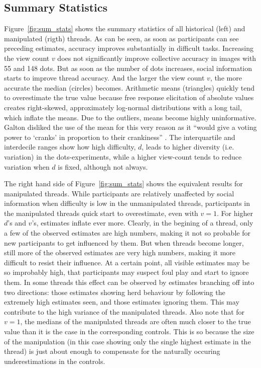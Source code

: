 \documentclass[9pt,a4paper,twocolumn,lineno]{article}
\begin{document}
\subsection*{Summary Statistics}
Figure~\ref{fig:sum_stats} shows the summary statistics of all historical (left) and manipulated (rigth) threads. As can be seen, as soon as participants can see preceding estimates, accuracy improves substantially in difficult tasks. Increasing the view count $v$ does not significantly improve collective accuracy in images with 55 and 148 dots. But as soon as the number of dots increases, social information starts to improve thread accuracy. And the larger the view count $v$, the more accurate the median (circles) becomes. Arithmetic means (triangles) quickly tend to overestimate the true value because free response elicitation of absolute values creates right-skewed, approximately log-normal distributions with a long tail, which inflate the means. Due to the outliers, means become highly uninformative. Galton disliked the use of the mean for this very reason as it “would give a voting power to ‘cranks’ in proportion to their crankiness” \cite{galton1907vox}. The interquartile and interdecile ranges show how high difficulty, $d$, leads to higher diversity (i.e. variation) in the dots-experiments, while a higher view-count tends to reduce variation when $d$ is fixed, although not always.

The right hand side of Figure~\ref{fig:sum_stats} shows the equivalent results for manipulated threads. While participants are relatively unaffected by social information when difficulty is low in the unmanipulated threads, participants in the manipulated threads quick start to overestimate, even with $v=1$. For higher $d$'s and $v$'s, estimates inflate ever more. Clearly, in the begining of a thread, only a few of the observed estimates are high numbers, making it not so probable for new participants to get influenced by them. But when threads become longer, still more of the observed estimates are very high numbers, making it more difficult to resist their influence. At a certain point, all visible estimates may be so improbably high, that participants may suspect foul play and start to ignore them. In some threads this effect can be observed by estimates branching off into two directions: those estimates showing herd behaviour by following the extremely high estimates seen, and those estimates ignoring them. This may contribute to the high variance of the manipulated threads. Also note that for $v=1$, the medians of the manipulated threads are often much closer to the true value than it is the case in the corresponding controls. This is so because the size of the manipulation (in this case showing only the single highest estimate in the thread) is just about enough to compensate for the naturally occuring underestimations in the controls.
\end{document}
